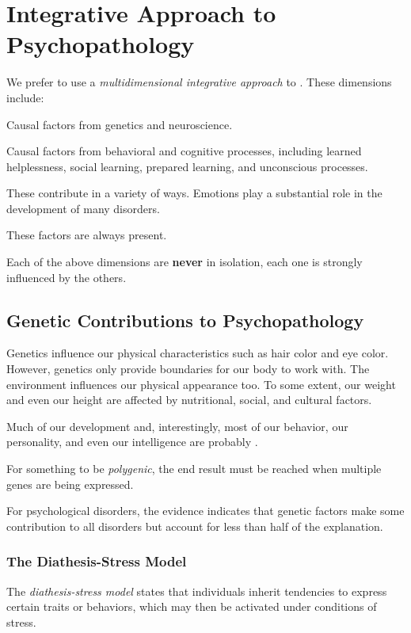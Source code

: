 \section{Integrative Approach to Psychopathology}\label{sec:Integrative_Approach}
We prefer to use a \emph{multidimensional integrative approach} to .
These dimensions include:
\begin{description}[noitemsep]
\item[Biological] Causal factors from genetics and neuroscience.
\item[Psychological] Causal factors from behavioral and cognitive processes, including learned helplessness, social learning, prepared learning, and unconscious processes.
\item[Emotional] These contribute in a variety of ways.
  Emotions play a substantial role in the development of many disorders.
\item[Developmental] These factors are always present.
\end{description}

Each of the above dimensions are \textbf{never} in isolation, each one is strongly influenced by the others.

\subsection{Genetic Contributions to Psychopathology}\label{subsec:Genetic_Contributions}
Genetics influence our physical characteristics such as hair color and eye color.
However, genetics only provide boundaries for our body to work with.
The environment influences our physical appearance too.
To some extent, our weight and even our height are affected by nutritional, social, and cultural factors.

Much of our development and, interestingly, most of our behavior, our personality, and even our intelligence are probably .

\begin{definition}[Polygenic]\label{def:Polygenic}
  For something to be \emph{polygenic}, the end result must be reached when multiple genes are being expressed.
\end{definition}

For psychological disorders, the evidence indicates that genetic factors make some contribution to all disorders but account for less than half of the explanation.

\subsubsection{The Diathesis-Stress Model}\label{subsubsec:Diathesis-Stress_Model}
\begin{definition}\label{def:Diathesis-Stress_Model}
  The \emph{diathesis-stress model} states that individuals inherit tendencies to express certain traits or behaviors, which may then be activated under conditions of stress.
\end{definition}

